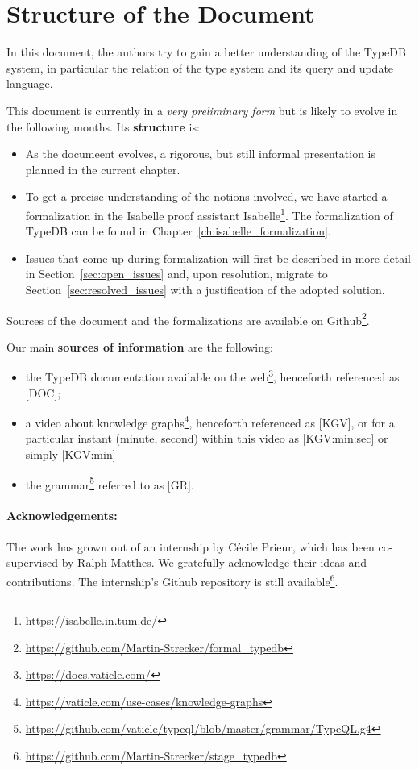 \section{Structure of the Document}

In this document, the authors try to gain a better understanding of the TypeDB
system, in particular the relation of the type system and its query and update
language.

This document is currently in a \emph{very preliminary form} but is likely to
evolve in the following months. Its \textbf{structure} is:

\begin{itemize}
\item As the documeent evolves, a rigorous, but still informal presentation is
  planned in the current chapter.
\item To get a precise understanding of the notions involved, we have started
  a formalization in the Isabelle proof assistant
  Isabelle\footnote{\url{https://isabelle.in.tum.de/}}. The formalization of
  TypeDB can be found in Chapter~\ref{ch:isabelle_formalization}. 
\item Issues that come up during formalization will first be described in more
  detail in Section~\ref{sec:open_issues} and, upon resolution, migrate to
  Section~\ref{sec:resolved_issues} with a justification of the adopted
  solution.
\end{itemize}

Sources of the document and the formalizations are available on
Github\footnote{\url{https://github.com/Martin-Strecker/formal_typedb}}.


Our main \textbf{sources of information} are the following:

\begin{itemize}
\item the TypeDB documentation available on the
  web\footnote{\url{https://docs.vaticle.com/}},
  henceforth referenced as [DOC];
\item a video about knowledge
  graphs\footnote{\url{https://vaticle.com/use-cases/knowledge-graphs}},
  henceforth referenced as [KGV], or for a particular instant (minute, second)
  within this video as [KGV:min:sec] or simply [KGV:min]
\item the
  grammar\footnote{\url{https://github.com/vaticle/typeql/blob/master/grammar/TypeQL.g4}}
  referred to as [GR].
\end{itemize}

\paragraph{Acknowledgements:} The work has grown out of an internship by
Cécile Prieur, which has been co-supervised by Ralph Matthes. We gratefully
acknowledge their ideas and contributions. The internship's
Github repository is still available\footnote{\url{https://github.com/Martin-Strecker/stage_typedb}}. 



